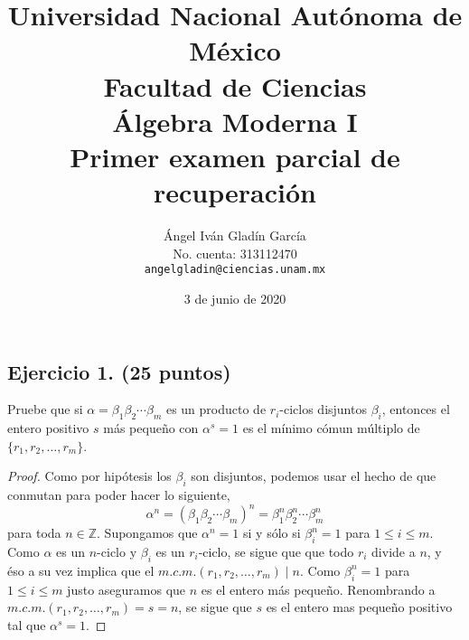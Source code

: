 \documentclass[letterpaper]{article}
\newcommand{\Z}{\mathbb{Z}}
\begin{document}
\title{
    \vspace{-2.2em}
        Universidad Nacional Autónoma de México\\
        Facultad de Ciencias\\
        Álgebra Moderna I\\
    \vspace{.5cm}
    \large
        \textbf{Primer examen parcial de recuperación}
}
\author{
    Ángel Iván Gladín García\\
    No. cuenta: 313112470\\
    \texttt{angelgladin@ciencias.unam.mx}
}
\date{3 de junio de 2020}
\maketitle

\newtheorem{theorem}{Teorema}
\newtheorem{example}{Ejemplo}
\newtheorem{corollary}{Corolario}
\newtheorem{lemma}{Lemma}
\newtheorem{definition}{Definicion}
\newtheorem{prop}{Proposicion}

\subsection*{Ejercicio 1. (25 puntos)}
Pruebe que si $\alpha = \beta_1 \beta_2 \cdots \beta_m$ es un producto de $r_i$-ciclos disjuntos $\beta_i$,
entonces el entero positivo $s$ más pequeño con $\alpha^s = 1$ es el mínimo cómun múltiplo de
$\{ r_1, r_2, \ldots, r_m \}$.

\begin{proof}
Como por hipótesis los $\beta_i$ son disjuntos, podemos usar el hecho de que conmutan para poder hacer lo siguiente,
\[
    \alpha^n = (\beta_1 \beta_2 \cdots \beta_m)^n = \beta_1^n \beta_2^n \cdots \beta_m^n
\]
para toda $n \in \Z$. Supongamos que $\alpha^n = 1$ si y sólo si $\beta_i^n = 1$ para $1 \leq i \leq m$.
Como $\alpha$ es un $n$-ciclo y $\beta_i$ es un $r_i$-ciclo, se sigue que que todo $r_i$ divide a $n$, y éso
a su vez implica que el $m.c.m.(r_1, r_2, \ldots, r_m) \mid n$. Como $\beta_i^n = 1$ para $1 \leq i \leq m$ 
justo aseguramos que $n$ es el entero más pequeño. Renombrando a $m.c.m.(r_1, r_2, \ldots, r_m) = s = n$,
se sigue que $s$ es el entero mas pequeño positivo tal que $\alpha^s = 1$.
\end{proof}
\end{document}
